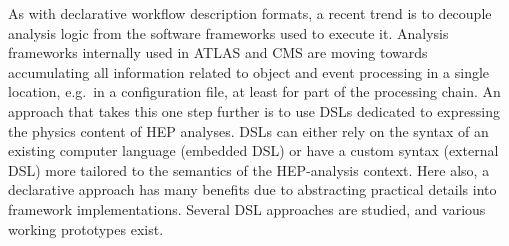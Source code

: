 \documentclass[11pt]{article}
\begin{document}
As with declarative workflow description formats, a recent trend is to decouple analysis logic from the software frameworks used to execute it. Analysis frameworks internally used in \gls{ATLAS} and \gls{CMS}
are moving towards accumulating all information related to object and event processing in a single location, e.g.~in a configuration file, at least for part of the processing chain. An approach that takes this one step further is to use \glspl{DSL} dedicated to expressing the physics content of \gls{HEP} analyses. \glspl{DSL} can either rely on the syntax of an existing computer language (embedded \gls{DSL}) or have a custom syntax (external \gls{DSL}) more tailored to the semantics of the \gls{HEP}-analysis context. Here also, a declarative approach has many benefits due to abstracting practical details into framework implementations. Several \gls{DSL} approaches are studied, and various working prototypes exist.

\end{document}
